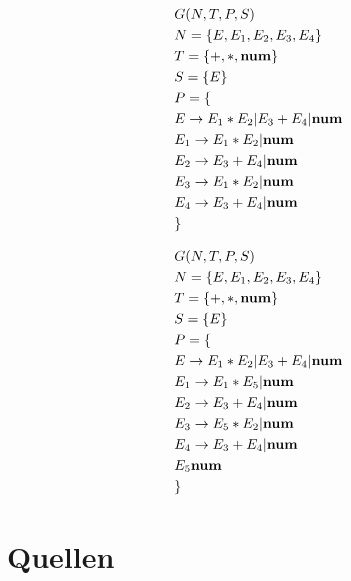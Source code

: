 \documentclass[t]{beamer}
\begin{document}
	\begin{frame}
		\begin{minipage}[c]{0.5\textwidth}
			\begin{align*}
				& G(N,T,P,S) \\
				& N= \{E, E_1, E_2, E_3, E_4\} \\
				& T= \{+, *, \bold{num}\} \\
				& S= \{E\} \\
				& P = \{ \\
				& E     \rightarrow E_1 * E_2 | E_3 + E_4 | \bold{num} \\
				& E_1   \rightarrow E_1 * E_2 | \bold{num} \\
				& E_2   \rightarrow E_3 + E_4 | \bold{num} \\
				& E_3   \rightarrow E_1 * E_2 | \bold{num} \\
				& E_4   \rightarrow E_3 + E_4 | \bold{num} \\
				& \}
			\end{align*}
		\end{minipage}%
		\begin{minipage}[c]{0.5\textwidth}
			\begin{align*}
				& G(N,T,P,S) \\
				& N= \{E, E_1, E_2, E_3, E_4\} \\
				& T= \{+, *, \bold{num}\} \\
				& S= \{E\} \\
				& P = \{ \\
				& E     \rightarrow E_1 * E_2 | E_3 + E_4 | \bold{num} \\
				& E_1   \rightarrow E_1 * E_5 | \bold{num} \\
				& E_2   \rightarrow E_3 + E_4 | \bold{num} \\
				& E_3   \rightarrow E_5 * E_2 | \bold{num} \\
				& E_4   \rightarrow E_3 + E_4 | \bold{num} \\
				& E_5   \bold{num} \\
				& \}
			\end{align*}
		\end{minipage}
	\end{frame}


	\section{Quellen}\label{sec:quellen}
	\begin{frame}[allowframebreaks]
		
		
	\end{frame}
\end{document}
